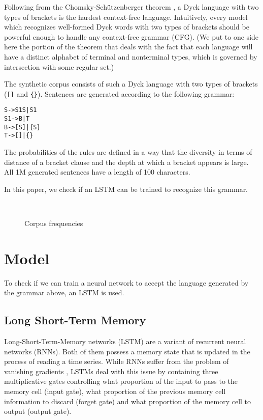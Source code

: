 \documentclass[11pt,a4paper]{article}
\newlength\figureheight
\newlength\figurewidth
\begin{document}
Following from the Chomsky-Sch\"utzenberger theorem \cite{chomsky1963algebraic, autebert1997context}, a Dyck language with two types of brackets is the hardest context-free language. Intuitively, every model which recognizes well-formed Dyck words with two types of brackets should be powerful enough to handle any context-free grammar (CFG). (We put to one side here the portion of the theorem that deals with the fact that each language will have a distinct alphabet of terminal and nonterminal types, which is governed by intersection with some regular set.)

The synthetic corpus consists of such a Dyck language with two types of brackets (\verb|[]| and \verb|{}|). Sentences are generated according to the following grammar:

\begin{alltt}
    S  -> S1 S | S1
    S1 -> B | T
    B  -> [ S ] | \{ S \}
    T  -> [ ] | \{ \}
\end{alltt}

The probabilities of the rules are defined in a way that the diversity in terms of distance of a bracket clause and the depth at which a bracket appears is large. All 1M generated sentences have a length of 100 characters.

In this paper, we check if an LSTM can be trained to recognize this grammar.

\setlength\figureheight{4cm}
\setlength\figurewidth{\linewidth}
\begin{figure}[ht]
    \\%
    \caption{Corpus frequencies}%
    \label{fig:corpus_frequencies}%
\end{figure}

\section{Model}

To check if we can train a neural network to accept the language generated by the grammar above, an LSTM is used.

\subsection{Long Short-Term Memory}

Long-Short-Term-Memory networks (LSTM) \cite{hochreiter1997long} are a variant of recurrent neural networks (RNNs). Both of them possess a memory state that is updated in the process of reading a time series. While RNNs suffer from the problem of vanishing gradients \cite{hochreiter1997long}, LSTMs deal with this issue by containing three multiplicative gates controlling what proportion of the input to pass to the memory cell (input gate), what proportion of the previous memory cell information to discard (forget gate) and what proportion of the memory cell to output (output gate).
\end{document}
